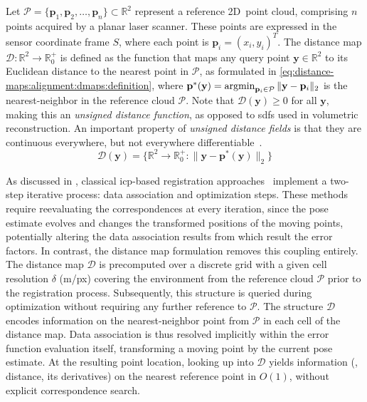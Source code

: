 Let $\mathcal{P} = \{\mathbf{p}_1, \mathbf{p}_2, \dots, \mathbf{p}_n\} \subset \mathbb{R}^2$
represent a reference 2D~point cloud,
comprising $n$ points acquired by a planar laser scanner.
These points are expressed in the sensor coordinate frame $S$,
where each point is $\mathbf{p}_i = (x_i, y_i)^T$.
The distance map $\mathcal{D}: \mathbb{R}^2\to\mathbb{R}_0^+$ is defined
as the function that maps any query point $\mathbf{y}\in\mathbb{R}^2$ to
its Euclidean distance to the nearest point in $\mathcal{P}$, as formulated in
\eqref{eq:distance-maps:alignment:dmaps:definition},
where $\mathbf{p}^*(\mathbf{y}) = \operatorname*{argmin}_{\mathbf{p}_i \in \mathcal{P}}
\|\mathbf{y} - \mathbf{p}_i\|_2$ is the nearest-neighbor in
the reference cloud $\mathcal{P}$.
Note that $\mathcal{D}(\mathbf{y}) \geq 0$ for all $\mathbf{y}$, making
this an \emph{unsigned distance function}, as opposed to
\glspl{sdf} used in volumetric reconstruction. An important property of
\emph{unsigned distance fields} is that they are continuous everywhere,
but not everywhere differentiable~\cite{jones:tvcg:2006}.
\begin{equation}
\label{eq:distance-maps:alignment:dmaps:definition}
\mathcal{D}(\mathbf{y}) =
\{ \mathbb{R}^2\to\mathbb{R}_0^+: \| \mathbf{y} - \mathbf{p}^*(\mathbf{y}) \|_2\}
\end{equation}

As discussed in ,
classical \gls{icp}-based registration
approaches~\cite{besl-mckay:tpami:1992,chen-medioni:icra:1991} implement a
two-step iterative process: data association and optimization steps.
These methods require reevaluating the correspondences at every iteration,
since the pose estimate evolves and changes the transformed positions of the
moving points, potentially altering the data association results from which
result the error factors.
In contrast, the distance map formulation removes this coupling entirely.
The distance map $\mathcal{D}$ is precomputed over a discrete grid
with a given cell resolution $\delta$ (m/px) covering the environment from
the reference cloud $\mathcal{P}$ prior to the registration process.
Subsequently, this structure is queried during optimization without requiring
any further reference to $\mathcal{P}$. The structure $\mathcal{D}$ encodes
information on the nearest-neighbor point from $\mathcal{P}$ in each cell of the
distance map. Data association is thus resolved implicitly within
the error function evaluation itself, transforming a moving point
by the current pose estimate. At the resulting point location,
looking up into $\mathcal{D}$ yields information
(\eg, distance, its derivatives) on the nearest reference point
in $O(1)$, without explicit correspondence search.

